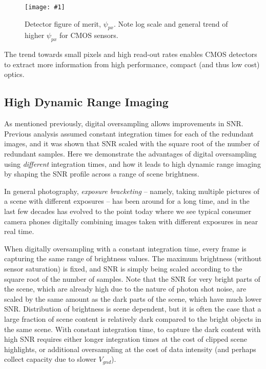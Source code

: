 \documentclass[10pt,journal]{IEEEtran}  %
\newcommand{\includefigure}[3]
{
  \begin{figure}[h!]
  \centering
  \texttt{[image: \#1]}
  \caption[]{#3}
  \label{#2}
  \end{figure}
}
\begin{document}
\includefigure{figures/p_kpi.pgf}{fig:psi_px}{Detector figure of merit, $\psi_{px}$.  Note log scale and general trend of higher $\psi_{px}$ for CMOS sensors.}

\begin{observation}
The trend towards small pixels and high read-out rates enables CMOS detectors to extract more information from high performance, compact (and thus low cost) optics.
\end{observation}

\subsection{High Dynamic Range Imaging}
\label{sec:hdr}

As mentioned previously, digital oversampling allows improvements in SNR. Previous analysis assumed constant integration times for each of the redundant images, and it was shown that SNR scaled with the square root of the number of redundant samples. Here we demonstrate the advantages of digital oversampling using \emph{different} integration times, and how it leads to high dynamic range imaging by shaping the SNR profile across a range of scene brightness.

In general photography, \emph{exposure bracketing} -- namely, taking multiple pictures of a scene with different exposures -- has been around for a long time, and in the last few decades has evolved to the point today where we see typical consumer camera phones digitally combining images taken with different exposures in near real time.

When digitally oversampling with a constant integration time, every frame is capturing the same range of brightness values.  The maximum brightness (without sensor saturation) is fixed, and SNR is simply being scaled according to the square root of the number of samples.  Note that the SNR for very bright parts of the scene, which are already high due to the nature of photon shot noise, are scaled by the same amount as the dark parts of the scene, which have much lower SNR. Distribution of brightness is scene dependent, but it is often the case that a large fraction of scene content is relatively dark compared to the bright objects in the same scene.  With constant integration time, to capture the dark content with high SNR requires either longer integration times at the cost of clipped scene highlights, or additional oversampling at the cost of data intensity (and perhaps collect capacity due to slower $V_{gnd}$).
\end{document}
